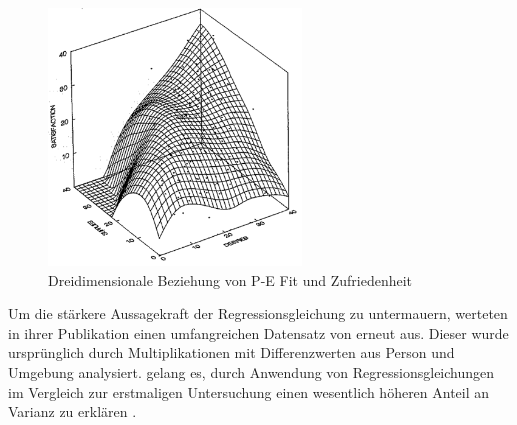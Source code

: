 \begin{figure}[h]
	\centering
	\includegraphics[width=0.6\textwidth]{gfx/drei_d_modell.png}
	\caption{Dreidimensionale Beziehung von P-E Fit und Zufriedenheit \cite[S. 57]{edwards:1991}}
	\label{fig:personEnvironmentFit:wichtigkeiten:abb2}
\end{figure}

Um die stärkere Aussagekraft der Regressionsgleichung zu untermauern, werteten \textcite[S. 18ff.]{edwards:1993b}  in ihrer Publikation einen umfangreichen Datensatz von \textcite[S. 9ff.]{mechanismsOfJobStressAndStrain:1982} erneut aus. Dieser wurde ursprünglich durch Multiplikationen mit Differenzwerten aus Person und Umgebung analysiert. \textcite[S. 18ff.]{edwards:1993b} gelang es, durch Anwendung von Regressionsgleichungen im Vergleich zur erstmaligen Untersuchung einen wesentlich höheren Anteil an Varianz zu erklären \cite[S. 8]{su:2015}.

